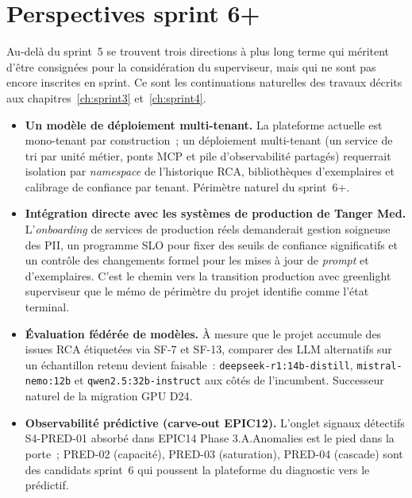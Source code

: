 \documentclass[11pt,a4paper,oneside]{report}
\begin{document}
\section{Perspectives sprint 6+}

Au-delà du sprint~5 se trouvent trois directions à plus long terme
qui méritent d'être consignées pour la considération du
superviseur, mais qui ne sont pas encore inscrites en sprint. Ce
sont les continuations naturelles des travaux décrits aux
chapitres~\ref{ch:sprint3} et~\ref{ch:sprint4}.

\begin{itemize}
  \item \textbf{Un modèle de déploiement multi-tenant.} La
        plateforme actuelle est mono-tenant par construction~;
        un déploiement multi-tenant (un service de tri par unité
        métier, ponts MCP et pile d'observabilité partagés)
        requerrait isolation par \emph{namespace} de l'historique
        RCA, bibliothèques d'exemplaires et calibrage de confiance
        par tenant. Périmètre naturel du sprint~6+.
  \item \textbf{Intégration directe avec les systèmes de production
        de Tanger Med.} L'\emph{onboarding} de services de
        production réels demanderait gestion soigneuse des PII, un
        programme SLO pour fixer des seuils de confiance
        significatifs et un contrôle des changements formel pour
        les mises à jour de \emph{prompt} et d'exemplaires. C'est
        le chemin vers la transition production avec greenlight
        superviseur que le mémo de périmètre du projet identifie
        comme l'état terminal.
  \item \textbf{Évaluation fédérée de modèles.} À mesure que le
        projet accumule des issues RCA étiquetées via SF-7 et SF-13,
        comparer des LLM alternatifs sur un échantillon retenu
        devient faisable~: \texttt{deepseek-r1:14b-distill},
        \texttt{mistral-nemo:12b} et \texttt{qwen2.5:32b-instruct}
        aux côtés de l'incumbent. Successeur naturel de la
        migration GPU D24.
  \item \textbf{Observabilité prédictive (carve-out EPIC12).}
        L'onglet signaux détectifs S4-PRED-01 absorbé dans EPIC14
        Phase 3.A.Anomalies est le pied dans la porte~; PRED-02
        (capacité), PRED-03 (saturation), PRED-04 (cascade) sont
        des candidats sprint~6 qui poussent la plateforme du
        diagnostic vers le prédictif.
\end{itemize}
\end{document}
